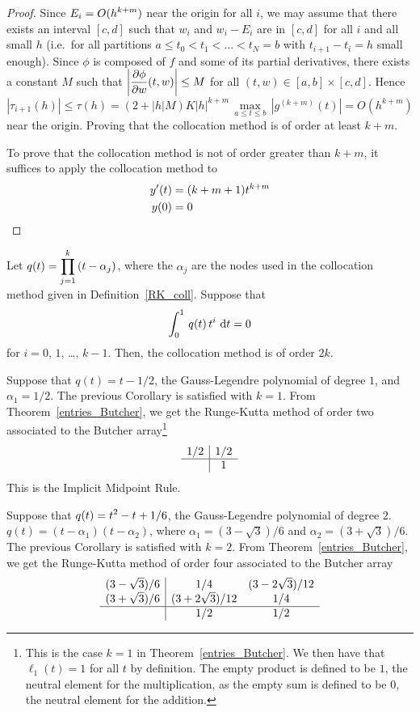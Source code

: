 \begin{proof}
Since $\displaystyle E_i = O(h^{k+m})$ near the origin for all $i$, we
may assume that there exists an interval $[c,d]$ such that $w_i$ and
$w_i-E_i$ are in $[c,d]$ for all $i$ and all small $h$ (i.e.\ for all
partitions $a \leq t_0 < t_1 < \dots < t_N = b$ with $t_{i+1}-t_i=h$ small
enough).  Since $\phi$ is composed of $f$ and some of its partial
derivatives, there exists a constant $M$ such that
$\left|\displaystyle \frac{\partial{\phi}}{\partial{w}}(t,w)\right| \leq M$ for all
$(t,w) \in [a,b]\times [c,d]$.
Hence
\[
|\tau_{i+1}(h)| \leq \tau(h) = \left( 2 + |h| M\right) K
|h|^{k+m}\,\max_{a\leq t \leq b}\, \left| g^{(k+m)}(t) \right| 
= O(h^{k+m})
\]
near the origin.  Proving that the collocation method is of
order at least $k+m$.

To prove that the collocation method is not of order greater than
$k+m$, it suffices to apply the collocation method to
\begin{align*}
y'(t) &= (k+m+1)t^{k+m} \\
y(0) &= 0  \qedhere
\end{align*}
\end{proof}

\begin{cor}
Let $\displaystyle q(t) = \prod_{j=1}^k\,(t-\alpha_j)$, where the
$\alpha_j$ are the nodes used in the collocation method given in
Definition~\ref{RK_coll}.  Suppose that
\[ 
\int_0^1 \, q(t)\,t^i\,\,\mathrm{d}t = 0
\]
for $i=0$, $1$, \ldots, $k-1$.  Then, the collocation method is of
order $2k$.
\label{best_IRK}
\end{cor}

\begin{egg}
Suppose that $q(t) = t- 1/2$, the Gauss-Legendre polynomial of degree
$1$, and $\alpha_1 = 1/2$.  The previous Corollary is satisfied with
$k=1$.   From Theorem~\ref{entries_Butcher}, we get the Runge-Kutta
method of order two associated to the Butcher array\footnote{This is
the case $k=1$ in Theorem~\ref{entries_Butcher}.  We then have that
$\ell_1(t) = 1$ for all $t$ by definition.  The empty product is
defined to be $1$, the neutral element for the multiplication, as the
empty sum is defined to be $0$, the neutral element for the addition.}
\[
\begin{array}{c|c}
1/2 & 1/2 \\
\hline
 & 1
\end{array}
\]
This is the Implicit Midpoint Rule.

Suppose that $\displaystyle q(t) = t^2 -t + 1/6$, the Gauss-Legendre
polynomial of degree $2$.  $q(t) = (t-\alpha_1)(t-\alpha_2)$, where
$\alpha_1 = (3- \sqrt{3})/6$ and $\alpha_2 = (3 + \sqrt{3})/6$.  The
previous Corollary is satisfied with $k=2$.  From
Theorem~\ref{entries_Butcher}, we get the Runge-Kutta method of
order four associated to the Butcher array
\[
\begin{array}{c|cc}
(3-\sqrt{3})/6 & 1/4 & (3-2 \sqrt{3})/12 \\
(3+\sqrt{3})/6 & (3 + 2 \sqrt{3})/12 & 1/4 \\
\hline
 & 1/2 & 1/2
\end{array}
\]
\label{Gauss_Leg_RK}
\end{egg}

